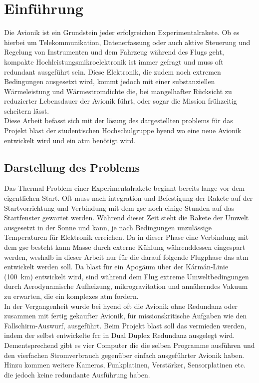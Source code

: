 \chapter{Einführung}			
\label{sec:Introduction}


Die Avionik ist ein Grundstein jeder erfolgreichen Experimentalrakete. Ob es hierbei um Telekommunikation,
Datenerfassung oder auch aktive Steuerung und Regelung von
Instrumenten und dem Fahrzeug während des Flugs geht, kompakte Hochleistungsmikroelektronik ist immer gefragt und muss oft redundant ausgeführt sein.
Diese Elektronik, die zudem noch extremen Bedingungen ausgesetzt wird, kommt jedoch mit einer
substanziellen Wärmeleistung und Wärmestromdichte die, bei mangelhafter Rücksicht zu reduzierter Lebensdauer der Avionik führt,
oder sogar die Mission frühzeitig scheitern lässt.\\

Diese Arbeit befasst sich mit der lösung des dargestellten problems für das Projekt \ac{blast} der studentischen Hochschulgruppe \ac{hyend}
wo eine neue Avionik entwickelt wird und ein \ac{atm} benötigt wird.

\section{Darstellung des Problems}

Das Thermal-Problem einer Experimentalrakete beginnt bereits lange vor dem eigentlichen Start. Oft muss nach integration und
Befestigung der Rakete auf der Startvorrichtung und Verbindung mit dem \ac{gse} noch einige Stunden auf das Startfenster gewartet werden.
Während dieser Zeit steht die Rakete der Umwelt ausgesetzt in der Sonne und kann, je nach Bedingungen 
unzulässige Temperaturen für Elektronik erreichen. Da in dieser Phase eine Verbindung mit dem 
\ac{gse} besteht kann Masse durch externe Kühlung währenddessen eingespart werden, weshalb in dieser Arbeit nur für die darauf folgende 
Flugphase das \ac{atm} entwickelt werden soll.
Da \ac{blast} für ein Apogäum über der Kármán-Linie (\SI{100}{\kilo\meter}) entwickelt wird, sind während dem Flug extreme Umweltbedingungen
durch Aerodynamische Aufheizung, mikrogravitation und annäherndes Vakuum zu erwarten, die ein komplexes \ac{atm} fordern.\\

In der Vergangenheit wurde bei \ac{hyend} oft die Avionik ohne Redundanz oder zusammen mit fertig gekaufter Avionik, für 
missionskritische Aufgaben wie den Fallschirm-Auswurf, ausgeführt. Beim Projekt \ac{blast} soll das vermieden werden, 
indem der selbst entwickelte \ac{fcc} in Dual Duplex Redundanz ausgelegt wird. Dementsprechend gibt es vier Computer die
die selben Programme ausführen und den vierfachen Stromverbrauch gegenüber einfach ausgeführter Avionik haben. Hinzu kommen
weitere Kameras, Funkplatinen, Verstärker, Sensorplatinen etc. die jedoch keine redundante Ausführung haben.\\

